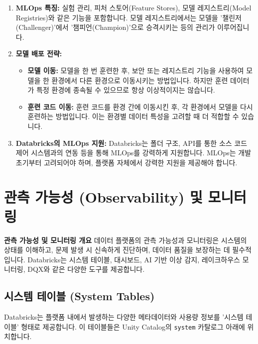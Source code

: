 \documentclass[11pt,a4paper]{article}
\theoremstyle{definition}
\begin{document}
\begin{enumerate}
    \item \textbf{MLOps 특징:}
    실험 관리, 피처 스토어(Feature Stores), 모델 레지스트리(Model Registries)와 같은 기능을 포함합니다. 모델 레지스트리에서는 모델을 '챌린저(Challenger)'에서 '챔피언(Champion)'으로 승격시키는 등의 관리가 이루어집니다.

    \item \textbf{모델 배포 전략:}
    \begin{itemize}
        \item \textbf{모델 이동:} 모델을 한 번 훈련한 후, 보안 또는 레지스트리 기능을 사용하여 모델을 한 환경에서 다른 환경으로 이동시키는 방법입니다. 하지만 훈련 데이터가 특정 환경에 종속될 수 있으므로 항상 이상적이지는 않습니다.
        \item \textbf{훈련 코드 이동:} 훈련 코드를 환경 간에 이동시킨 후, 각 환경에서 모델을 다시 훈련하는 방법입니다. 이는 환경별 데이터 특성을 고려할 때 더 적합할 수 있습니다.
    \end{itemize}

    \item \textbf{Databricks의 MLOps 지원:}
    Databricks는 폴더 구조, API를 통한 소스 코드 제어 시스템과의 연동 등을 통해 MLOps를 강력하게 지원합니다. MLOps는 개발 초기부터 고려되어야 하며, 플랫폼 자체에서 강력한 지원을 제공해야 합니다.
\end{enumerate}

\newpage
\section{관측 가능성 (Observability) 및 모니터링}

\begin{tcolorbox}[conceptbox] %
\textbf{관측 가능성 및 모니터링 개요}
데이터 플랫폼의 관측 가능성과 모니터링은 시스템의 상태를 이해하고, 문제 발생 시 신속하게 진단하며, 데이터 품질을 보장하는 데 필수적입니다. Databricks는 시스템 테이블, 대시보드, AI 기반 이상 감지, 레이크하우스 모니터링, DQX와 같은 다양한 도구를 제공합니다.
\end{tcolorbox}

\subsection{시스템 테이블 (System Tables)}
Databricks는 플랫폼 내에서 발생하는 다양한 메타데이터와 사용량 정보를 '시스템 테이블' 형태로 제공합니다. 이 테이블들은 Unity Catalog의 \texttt{system} 카탈로그 아래에 위치합니다.
\end{document}
